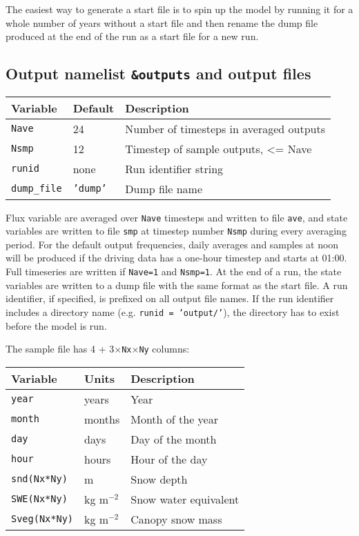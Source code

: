 \documentclass{article}
\begin{document}
The easiest way to generate a start file is to spin up the model by running it for a whole number of years without a start file and then rename the dump file produced at the end of the run as a start file for a new run.

\subsection*{Output namelist {\tt \&outputs} and output files}

\begin{tabular}{|l|l|l|}
\hline
Variable         & Default      & Description                             \\
\hline
{\tt Nave}       & 24           & Number of timesteps in averaged outputs \\
{\tt Nsmp}       & 12           & Timestep of sample outputs, <= Nave     \\
{\tt runid}      & none         & Run identifier string                   \\
{\tt dump\_file} & {\tt 'dump'} & Dump file name                          \\
\hline 
\end{tabular}

Flux variable are averaged over {\tt Nave} timesteps and written to file {\tt ave}, and state variables are written to file {\tt smp} at timestep number {\tt Nsmp} during every averaging period. For the default output frequencies, daily averages and samples at noon will be produced if the driving data has a one-hour timestep and starts at 01:00. Full timeseries are written if {\tt Nave=1} and {\tt Nsmp=1}. At the end of a run, the state variables are written to a dump file with the same format as the start file. A run identifier, if specified, is prefixed on all output file names. If the run identifier includes a directory name (e.g. {\tt runid = 'output/'}), the directory has to exist before the model is run.

The sample file has 4 + 3$\times${\tt Nx$\times$Ny} columns:

\begin{tabular}{|l|l|l|}
\hline
Variable          & Units       & Description           \\
\hline
{\tt year}        & years       & Year                  \\
{\tt month}       & months      & Month of the year     \\
{\tt day}         & days        & Day of the month      \\
{\tt hour}        & hours       & Hour of the day       \\
{\tt snd(Nx*Ny)}  & m           & Snow depth            \\
{\tt SWE(Nx*Ny)}  & kg m$^{-2}$ & Snow water equivalent \\
{\tt Sveg(Nx*Ny)} & kg m$^{-2}$ & Canopy snow mass      \\
\hline 
\end{tabular}
\end{document}
